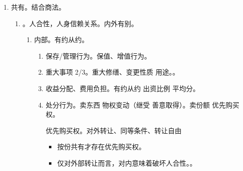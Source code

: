 \begin{enumerate}
\begin{enumerate}
          \item 管理权、成员权、表决权。
          \item 住改商。
                \begin{enumerate}
                  \item 不得违反法律法规、管理规约。
                  \item 利害关系业主一票否决制。
                  \item 利害关系业主的认定。\yi 本栋。\er 能证明房屋价值、生活质量受到 \hz 可能受到不利影响的其他业主。
                \end{enumerate}
          \item 业主大会/业主委员会。
                \begin{enumerate}
                  \item 弃置垃圾、排放污染物、噪声、违规饲养动物、违建、侵占通道、拒付物业费。
                  \item 有关当事人可以向有关行政主观部门投诉。\sjt 都是间接影响你的。
                \end{enumerate}
        \end{enumerate}
  \item 共有。结合商法。
        \begin{enumerate}
          \item {}。人合性，人身信赖关系。内外有别。
                \begin{enumerate}
                  \item 内部。有约从约。
                        \begin{enumerate}
                          \item 保存/管理行为。保值、增值行为。
                          \item 重大事项 2/3。重大修缮、变更性质 \hz 用途。。
                          \item 收益分配、费用负担。有约从约 \yjt 出资比例 \yjt 平均分。
                          \item 处分行为。\yi 卖东西 \yjt 物权变动（继受 \hz 善意取得）。\er 卖份额 \yjt 优先购买权。
                                \begin{kk}{优先购买权。对外转让、同等条件、转让自由}
                                  \begin{itemize}
                                    \item 按份共有才存在优先购买权。
                                    \item 仅对外部转让而言，对内意味着破坏人合性。。

\end{itemize}
\end{kk}
\end{enumerate}
\end{enumerate}
\end{enumerate}
\end{enumerate}
